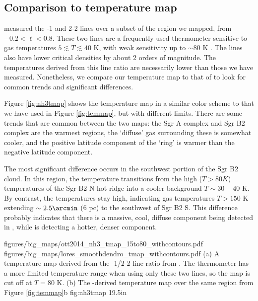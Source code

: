 \subsection{Comparison to \citet{Ott2014a} \ammonia temperature map}
\label{sec:ammoniacompare}
\citet{Ott2014a} measured the -1 and 2-2 lines over a subset of the
region we mapped, from $-0.2 < \ell < 0.8$.  These two lines are a frequently
used thermometer sensitive to gas temperatures $5 \lesssim T \lesssim 40$ K,
with weak sensitivity up to $\sim80$ K \citep[][Figure 1]{Mangum2013a}.  The
\ammonia lines also have lower critical densities by about 2 orders of
magnitude.  The temperatures
derived from this line ratio are necessarily lower than those we have measured.
Nonetheless, we compare our temperature map to that of \citet{Ott2014a} to look
for common trends and significant differences.

Figure \ref{fig:nh3tmap} shows the \citet{Ott2014a} temperature map in a
similar color scheme to that we have used in Figure \ref{fig:temmap}, but with
different limits.  There are some trends that are common between the two maps:
the Sgr A complex and Sgr B2 complex are the warmest regions, the `diffuse' gas
surrounding these is somewhat cooler, and the positive latitude component of
the \citet{Molinari2011a} `ring' is warmer than the negative latitude
component.

The most significant difference occurs in the southwest portion of the Sgr B2
cloud.  In this region, the \ammonia temperature transitions from the high
($T>80K$) temperatures of the Sgr B2 N hot ridge into a cooler background
$T\sim30-40$ K.  By contrast, the \formaldehyde temperatures stay high,
indicating gas temperatures $T>150$ K extending $\sim2.5\arcmin$ (6 pc) to the
southwest of Sgr B2 S.  This difference probably indicates that there is a
massive, cool, diffuse component being detected in \ammonia, while
\formaldehyde is detecting a hotter, denser component.

\RotFigureTwoAA
{figures/big_maps/ott2014_nh3_tmap_15to80_withcontours.pdf}
{figures/big_maps/lores_smoothdendro_tmap_withcontours.pdf}
{(a) A temperature map derived from the -1/2-2 line ratio from
\citet{Ott2014a}.  The \ammonia thermometer has a more limited temperature
range when using only these two lines, so the map is cut off at $T=80$ K.
(b) The \para-derived temperature map over the same region from Figure
\ref{fig:temmap}b
}
{fig:nh3tmap}
{1}{9.5in}

